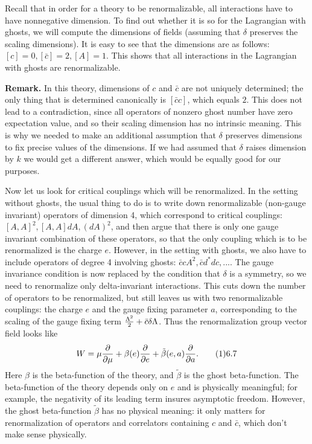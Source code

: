 Recall that in order for a theory to be renormalizable,
all interactions have to have nonnegative dimension. To find out whether it is 
so for the Lagrangian with ghosts, we will compute the dimensions of fields
(assuming that $\delta$ preserves the scaling dimensions). It is easy to see 
that the dimensions are as follows: 
$[c]=0,[\bar c]=2,[A]=1$. This shows that all interactions 
in the Lagrangian with ghosts are renormalizable. 

{\bf Remark.} In this theory, dimensions of $c$ and $\bar c$ are not uniquely 
determined; the only thing that is determined canonically is $[\bar cc]$,
which equals $2$. This does not lead to a contradiction, since all operators 
of nonzero ghost number have zero expectation value, and so their
scaling dimension has no intrinsic
meaning. This is why we needed to make an additional 
assumption that $\delta$ preserves dimensions to fix precise values 
of the dimensions. If we had assumed that $\delta$ raises dimension by 
$k$ we would get a different answer, which would be equally good for our 
purposes. 

Now let us look for critical couplings which will be renormalized. 
In the setting without ghosts, the usual thing to do is to 
write down renormalizable 
(non-gauge invariant) operators of dimension 4, which correspond to 
critical couplings: $[A,A]^2, [A,A]dA,(dA)^2$, and then argue 
that there is only one gauge invariant combination of these operators, 
so that the only coupling which is to be 
renormalized is the charge $e$. However, in the setting with ghosts, 
we also have to include operators of degree 4 
involving ghosts: $\bar ccA^2,\bar cd^*dc,...$. The gauge invariance condition 
is now replaced by the condition that $\delta$ is a symmetry, so we need 
to renormalize only delta-invariant interactions. This cuts down the number 
of operators to be renormalized, but still leaves us with two 
renormalizable couplings: the charge $e$ and the gauge fixing parameter $a$, 
corresponding to the scaling of the gauge fixing term 
$\frac{\Lambda^2}{2}+\bar c\delta\Lambda$. 
Thus the renormalization group vector field looks like
$$
W=\mu\frac{\d}{\d\mu}+\beta(e)\frac{\d}{\d e}+\tilde\beta(e,a)\frac{\d}{\d a}
.\tag 16.7
$$
Here $\beta$ is the beta-function of the theory, and $\tilde\beta$ 
is the ghost beta-function. The beta-function of the theory 
 depends only on $e$ and is physically meaningful; for example, 
the negativity of its 
leading term insures asymptotic freedom. However, 
the ghost beta-function $\tilde\beta$ has no physical meaning: 
it only matters for renormalization of operators 
and correlators containing $c$ and $\bar c$, which don't 
make sense physically. 

